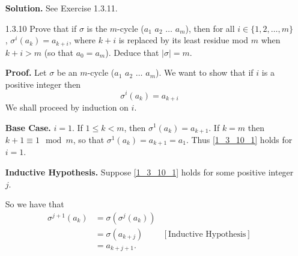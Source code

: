 \begin{enumerate}
      \textbf{Solution.} See Exercise 1.3.11.
   \item[1.3.10]  Prove that if $\sigma$ is the $m$-cycle
                  ($a_1$ $a_2$ $\ldots$ $a_m$), then for all
                  $i \in \{1, 2, \ldots, m\}$, $\sigma^i(a_k) = a_{k+i}$,
                  where $k + i$ is replaced by its least residue mod $m$ when
                  $k + i > m$ (so that $a_0 = a_m$). Deduce that
                  $|\sigma| = m$.

      \textbf{Proof.} Let $\sigma$ be an $m$-cycle ($a_1$ $a_2$ $\ldots$ $a_m$).
      We want to show that if $i$ is a positive integer then
      \begin{equation} \label{1_3_10_1}
         \sigma^i(a_k) = a_{k+i}
      \end{equation}
      We shall proceed by induction on $i$.

      \textbf{Base Case.} $i = 1$. If $1 \le k < m$, then
      $\sigma^1(a_k) = a_{k+1}$. If $k = m$ then $k + 1 \equiv 1 \mod m$, so
      that $\sigma^1(a_k) = a_{k+1} = a_1$. Thus \eqref{1_3_10_1} holds for
      $i = 1$.

      \textbf{Inductive Hypothesis.} Suppose \eqref{1_3_10_1} holds for some
      positive integer $j$.

      So we have that
      \begin{align*}
         \sigma^{j+1}(a_k) &= \sigma(\sigma^j(a_k)) \\
            &= \sigma(a_{k+j}) &[\text{Inductive Hypothesis}] \\
            &= a_{k+j+1}.
      \end{align*}


\end{enumerate}

